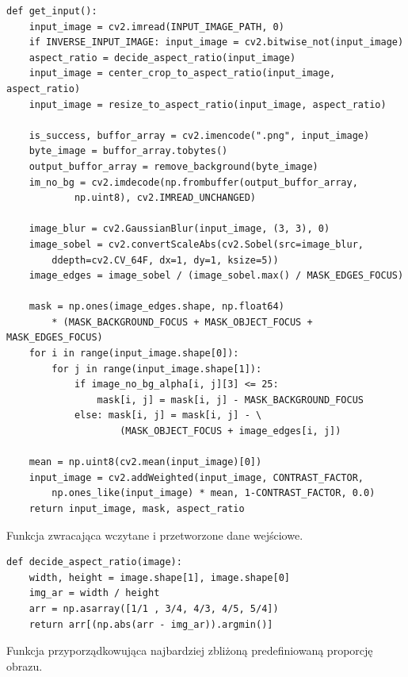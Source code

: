\documentclass[a4paper, 12pt, polish, twoside]{extreport}
\begin{document}
        \begin{code}[H]
        \begin{verbatim}
def get_input(): 
    input_image = cv2.imread(INPUT_IMAGE_PATH, 0)
    if INVERSE_INPUT_IMAGE: input_image = cv2.bitwise_not(input_image)
    aspect_ratio = decide_aspect_ratio(input_image)
    input_image = center_crop_to_aspect_ratio(input_image, aspect_ratio)
    input_image = resize_to_aspect_ratio(input_image, aspect_ratio)

    is_success, buffor_array = cv2.imencode(".png", input_image)
    byte_image = buffor_array.tobytes()
    output_buffor_array = remove_background(byte_image)
    im_no_bg = cv2.imdecode(np.frombuffer(output_buffor_array, 
            np.uint8), cv2.IMREAD_UNCHANGED)

    image_blur = cv2.GaussianBlur(input_image, (3, 3), 0)
    image_sobel = cv2.convertScaleAbs(cv2.Sobel(src=image_blur,
        ddepth=cv2.CV_64F, dx=1, dy=1, ksize=5))
    image_edges = image_sobel / (image_sobel.max() / MASK_EDGES_FOCUS)

    mask = np.ones(image_edges.shape, np.float64)
        * (MASK_BACKGROUND_FOCUS + MASK_OBJECT_FOCUS + MASK_EDGES_FOCUS)
    for i in range(input_image.shape[0]):
        for j in range(input_image.shape[1]):
            if image_no_bg_alpha[i, j][3] <= 25:
                mask[i, j] = mask[i, j] - MASK_BACKGROUND_FOCUS
            else: mask[i, j] = mask[i, j] - \
                    (MASK_OBJECT_FOCUS + image_edges[i, j])

    mean = np.uint8(cv2.mean(input_image)[0]) 
    input_image = cv2.addWeighted(input_image, CONTRAST_FACTOR, 
        np.ones_like(input_image) * mean, 1-CONTRAST_FACTOR, 0.0)
    return input_image, mask, aspect_ratio 
        \end{verbatim}
        \caption{Funkcja zwracająca wczytane i przetworzone dane wejściowe.}
        \label{imp-art-input-code}
        \end{code}
        
        \begin{code}[H]
        \begin{verbatim}
def decide_aspect_ratio(image):
    width, height = image.shape[1], image.shape[0]
    img_ar = width / height
    arr = np.asarray([1/1 , 3/4, 4/3, 4/5, 5/4])
    return arr[(np.abs(arr - img_ar)).argmin()]
        \end{verbatim}
        \caption{Funkcja przyporządkowująca najbardziej zbliżoną  predefiniowaną proporcję obrazu.}
        \label{imp-art-input-ar-code}
        \end{code}
        
\end{document}
